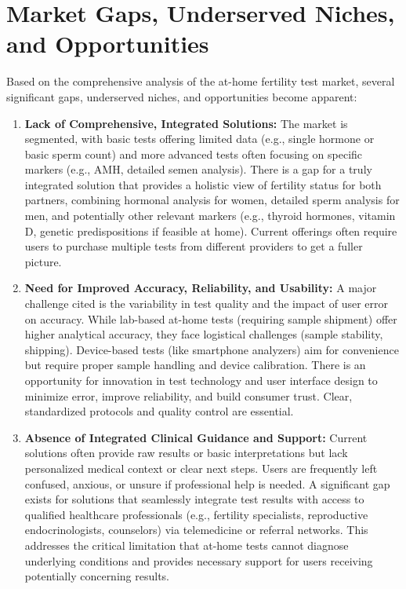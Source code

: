 \documentclass{article}
\begin{document}
\section{Market Gaps, Underserved Niches, and Opportunities}

Based on the comprehensive analysis of the at-home fertility test market, several significant gaps, underserved niches, and opportunities become apparent:

\begin{enumerate}[label=\arabic*.]
    \item \textbf{Lack of Comprehensive, Integrated Solutions:} The market is segmented, with basic tests offering limited data (e.g., single hormone or basic sperm count) and more advanced tests often focusing on specific markers (e.g., AMH, detailed semen analysis). There is a gap for a truly integrated solution that provides a holistic view of fertility status for both partners, combining hormonal analysis for women, detailed sperm analysis for men, and potentially other relevant markers (e.g., thyroid hormones, vitamin D, genetic predispositions if feasible at home). Current offerings often require users to purchase multiple tests from different providers to get a fuller picture.
    \item \textbf{Need for Improved Accuracy, Reliability, and Usability:} A major challenge cited is the variability in test quality and the impact of user error on accuracy. While lab-based at-home tests (requiring sample shipment) offer higher analytical accuracy, they face logistical challenges (sample stability, shipping). Device-based tests (like smartphone analyzers) aim for convenience but require proper sample handling and device calibration. There is an opportunity for innovation in test technology and user interface design to minimize error, improve reliability, and build consumer trust. Clear, standardized protocols and quality control are essential.
    \item \textbf{Absence of Integrated Clinical Guidance and Support:} Current solutions often provide raw results or basic interpretations but lack personalized medical context or clear next steps. Users are frequently left confused, anxious, or unsure if professional help is needed. A significant gap exists for solutions that seamlessly integrate test results with access to qualified healthcare professionals (e.g., fertility specialists, reproductive endocrinologists, counselors) via telemedicine or referral networks. This addresses the critical limitation that at-home tests cannot diagnose underlying conditions and provides necessary support for users receiving potentially concerning results.

\end{enumerate}
\end{document}
